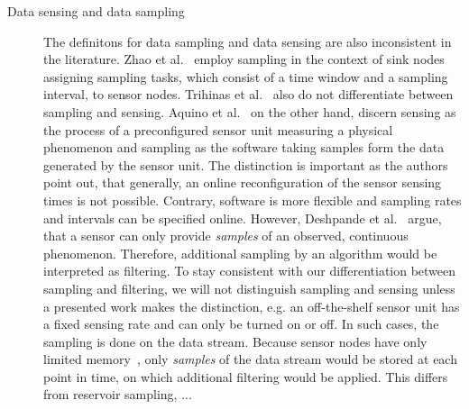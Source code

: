 \begin{description}
    \item[Data sensing and data sampling ] 
        The definitons for data sampling and data sensing are also inconsistent
        in the literature. Zhao et al.~\cite{zhao2016cats} employ sampling in
        the context of sink nodes assigning sampling tasks, which consist of a
        time window and a sampling interval, to sensor nodes. Trihinas et
        al.~\cite{trihinas2015adam} also do not differentiate between sampling
        and sensing.  Aquino et al.~\cite{aquino2014musa} on the other hand,
        discern sensing as the process of a preconfigured sensor unit measuring
        a physical phenomenon and sampling as the software taking samples form
        the data generated by the sensor unit. The distinction is important as
        the authors point out, that generally, an online reconfiguration of the
        sensor sensing times is not possible. Contrary, software is more
        flexible and sampling rates and intervals can be specified online.
        However, Deshpande et al.~\cite{deshpande2004model} argue, that a
        sensor can only provide \textit{samples} of an observed, continuous
        phenomenon. Therefore, additional sampling by an algorithm would be
        interpreted as filtering. To stay consistent with our differentiation
        between sampling and filtering, we will not distinguish sampling and
        sensing unless a presented work makes the distinction, e.g. an
        off-the-shelf sensor unit has a fixed sensing rate and can only be
        turned on or off. In such cases, the sampling is done on the data
        stream. Because sensor nodes have only limited
        memory~\cite{akyildiz2002wireless}, only \textit{samples} of the data
        stream would be stored at each point in time, on which additional
        filtering would be applied. This differs from reservoir sampling, ...
\end{description}

